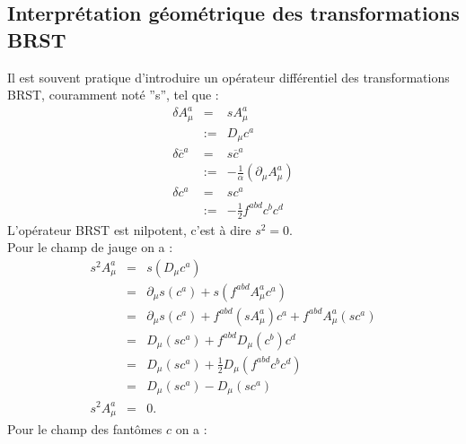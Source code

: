 \documentclass[a4paper,11pt]{article} %
\theoremstyle{plain}
\theoremstyle{definition}
\theoremstyle{remark}
\numberwithin{equation}{section}
\numberwithin{equation}{subsection}
\numberwithin{figure}{section}
\begin{document}
  \subsection{Interprétation géométrique des transformations BRST}


\noindent
Il est souvent pratique d'introduire un opérateur différentiel des transformations BRST, couramment noté ''s'', tel que :
\begin{eqnarray*}
 \delta A^{a}_{\mu}  &=& s A^{a}_{\mu}  \\
                                   &:=&  D_{\mu} c^{a} \\
 \delta \overline{c}^{a}  &=& s  \overline{c}^{a} \\
                                         &:=& - \frac{1}{\alpha} \left( \partial_{\mu} A^{a}_{\mu} \right) \\
 \delta c^{a} &=& s c^{a} \\
                      &:=& - \frac{1}{2} f^{abd} c^{b} c^{d}
\end{eqnarray*}
L'opérateur BRST est nilpotent, c'est à dire $s^2 =0$. \\
Pour le champ de jauge on a :
\begin{eqnarray*}
 s^2 A^{a}_{\mu}  &=& s \left( D_{\mu} c^{a} \right) \\
                               &=& \partial_{\mu} s \left( c^{a} \right) + s \left( f^{abd} A^{a}_{\mu} c^{a} \right)  \\
                               &=& \partial_{\mu} s \left( c^{a} \right) +  f^{abd} \left( s A^{a}_{\mu} \right) c^{a} +  f^{abd}  A^{a}_{\mu} 
\left( s c^{a} \right)  \\
                               &=& D_{\mu} (s c^{a} ) +  f^{abd} D_{\mu} (c^{b} ) c^{d} \\
                               &=& D_{\mu} (s c^{a} ) +  \frac{1}{2} D_{\mu}  ( f^{abd} c^{b} c^{d} ) \\
                               &=& D_{\mu} (s c^{a} )  -  D_{\mu}  ( s c^{a} ) \\
 s^2 A^{a}_{\mu} &=& 0.
\end{eqnarray*}
Pour le champ des fantômes $c$ on a :
\end{document}
